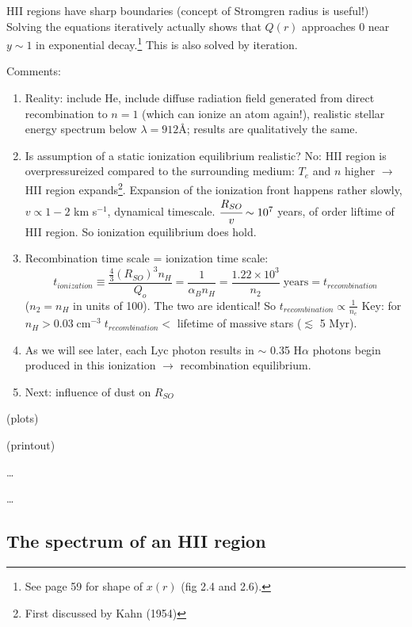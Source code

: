 \documentclass[11pt]{article}
\newcommand{\mar}[1]{\hspace{0pt}\marginpar{-\textcolor{black}{#1}-}}
\begin{document}
HII regions have sharp boundaries (concept of Stromgren radius is useful!)
Solving the equations iteratively actually shows that $Q(r)$ approaches 0
near $ y \sim 1 $ in exponential decay.\footnote{
    See page 59 for shape of $x(r)$ (fig 2.4 and 2.6).}
This is also solved by iteration.

\mar{58}Comments:
\begin{enumerate}[itemsep=1ex]
    \item Reality: include He, include diffuse radiation field generated
        from direct recombination to $n=1$ (which can ionize an atom again!),
        realistic stellar energy spectrum below $\lambda = 912$\AA{};
        results are qualitatively the same.
    \item Is assumption of a static ionization equilibrium realistic? No: HII
        region is overpressureized compared to the surrounding medium: $T_{e}$ and
        $n$ higher $\longrightarrow$ HII region expands\footnote{First discussed
        by Kahn (1954)}. Expansion of the ionization front happens rather
        slowly, $v \propto 1-2$ km s$^{-1}$, dynamical timescale.
        $\cfrac{R_{SO}}{v} \sim 10^{7}$ years, of order liftime of HII region.
        So ionization equilibrium does hold.
    \item Recombination time scale = ionization time scale:
        \[
            t_{ionization} \equiv \frac{\frac{4}{3}(R_{SO})^{3}n_{H}}{Q_{o}}
            = \frac{1}{\alpha_{B}n_{H}}
            = \frac{1.22\times10^{3}}{n_{2}}\;\mathrm{years}
            = t_{recombination}
            \]
        ($n_{2} = n_{H}$ in units of 100). The two are identical! So
        $t_{recombination} \propto \frac{1}{n_{e}}$
        Key: for $n_{H} > 0.03\;\mathrm{cm}^{-3}\;t_{recombination} <$
        lifetime of massive stars ($\lesssim$ 5 Myr).
    \item As we will see later, each Lyc photon results in $\sim$ 0.35
        H$\alpha$ photons begin produced in this ionization $\rightarrow$
        recombination equilibrium.
    \item Next: influence of dust on $R_{SO}$
\end{enumerate}
\mar{59}(plots)

\mar{60}(printout)

\mar{61}\ldots

\mar{62}\ldots

\subsection{The spectrum of an HII region}
\end{document}
